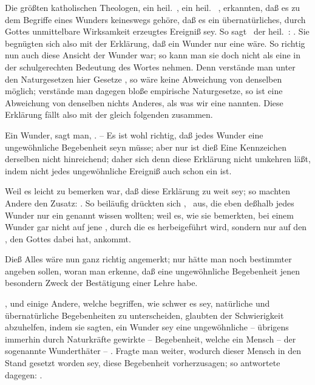 \begin{aufza}\setcounter{enumi}{5}
\item Die größten katholischen Theologen, ein heil.\ , ein heil.\  \uA , erkannten, daß es zu dem Begriffe eines Wunders keineswegs gehöre, daß es ein übernatürliches, durch Gottes unmittelbare Wirksamkeit erzeugtes Ereigniß sey. So sagt \zB\ der heil.\ : . Sie begnügten sich also mit der Erklärung, daß ein Wunder nur eine  wäre. So richtig nun auch diese Ansicht der Wunder war; so kann man sie doch nicht als eine  in der schulgerechten Bedeutung des Wortes nehmen. Denn verstände man unter den Naturgesetzen hier Gesetze , so wäre keine Abweichung von denselben möglich; verstände man dagegen bloße empirische Naturgesetze, so ist eine Abweichung von denselben nichts Anderes, als was wir eine  nannten. Diese Erklärung fällt also mit der gleich folgenden zusammen.~
\item Ein Wunder, sagt man, . -- Es ist wohl richtig, daß jedes Wunder eine ungewöhnliche Begebenheit seyn müsse; aber nur ist dieß Eine Kennzeichen derselben nicht hinreichend; daher sich denn diese Erklärung nicht umkehren läßt, indem nicht jedes ungewöhnliche Ereigniß auch schon ein  ist.
\item Weil es leicht zu bemerken war, daß diese Erklärung zu weit sey; so machten Andere den Zusatz: . So beiläufig drückten sich , \uA\ aus, die eben deßhalb jedes Wunder nur ein  genannt wissen wollten; weil es, wie sie bemerkten, bei einem Wunder gar nicht auf jene , durch die es herbeigeführt wird, sondern nur auf den , den Gottes  dabei hat, ankommt.
\end{aufza}\par
Dieß Alles wäre nun ganz richtig angemerkt; nur hätte man noch bestimmter angeben sollen, woran man erkenne, daß eine ungewöhnliche Begebenheit jenen besondern Zweck der Bestätigung einer Lehre habe.
\begin{aufza}\setcounter{enumi}{8}
\item {}, und einige Andere, welche begriffen, wie schwer es sey, natürliche und übernatürliche Begebenheiten zu unterscheiden, glaubten der Schwierigkeit abzuhelfen, indem sie sagten, ein Wunder sey eine ungewöhnliche -- übrigens immerhin durch Naturkräfte gewirkte -- Begebenheit, welche ein Mensch -- der sogenannte Wunderthäter -- . Fragte man weiter, wodurch dieser Mensch in den Stand gesetzt worden sey, diese Begebenheit vorherzusagen; so antwortete  dagegen: .
\end{aufza}\par
